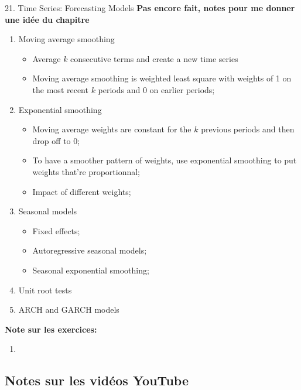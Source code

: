 \documentclass[12pt, titlepage, french]{report}
\begin{document}
\begin{CHPT_SUMM}{21. Time Series: Forecasting Models}
\textbf{Pas encore fait, notes pour me donner une idée du chapitre}
\begin{enumerate}
	\item	Moving average smoothing
	\begin{itemize}
		\item	Average $k$ consecutive terms and create a new time series
		\item	Moving average smoothing is weighted least square with weights of 1 on the most recent $k$ periods and 0 on earlier periods;
	\end{itemize}
	\item	Exponential smoothing
	\begin{itemize}
		\item	Moving average weights are constant for the $k$ previous periods and then drop off to 0;
		\item	To have a smoother pattern of weights, use exponential smoothing to put weights that're proportionnal;
		\item	Impact of different weights;
	\end{itemize}
	\item	Seasonal models
	\begin{itemize}
		\item	Fixed effects;
		\item	Autoregressive seasonal models;
		\item	Seasonal exponential smoothing;
	\end{itemize}
	\item	Unit root tests
	\item	ARCH and GARCH models
\end{enumerate}
\textbf{Note sur les exercices:} 
\begin{enumerate}
	\item	
\end{enumerate}
\end{CHPT_SUMM}

\subsection{Notes sur les vidéos YouTube}
\end{document}
